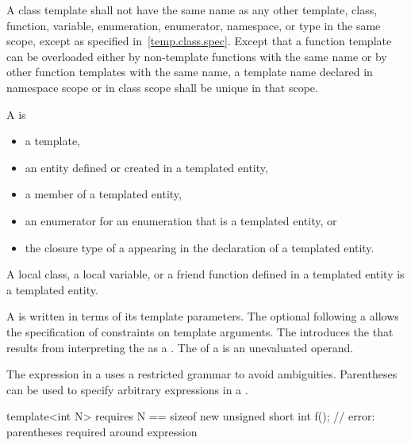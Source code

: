 \pnum
A class template shall not have the same name as any other
template, class, function, variable, enumeration, enumerator, namespace, or
type in the same scope, except as specified in~\ref{temp.class.spec}.
Except that a function template can be overloaded either by non-template
functions with the same name or by other function templates
with the same name,
a template name declared in namespace scope or in class scope shall be unique
in that scope.

\pnum
{}%
A  is

\begin{itemize}
\item a template,
\item an entity defined or created
      in a templated entity,
\item a member of a templated entity,
\item an enumerator for an enumeration that is a templated entity, or
\item the closure type of a 
      appearing in the declaration of a templated entity.
\end{itemize}

\begin{note}
A local class, a local variable, or a friend function defined in a
templated entity is a templated entity.
\end{note}

\pnum
A  is written
in terms of its template parameters.
The optional  following a
 allows the specification of
constraints on template arguments.
The  introduces the
 that results from interpreting
the  as a
.
The  of a
 is an unevaluated operand.
\begin{note}
The expression in a 
uses a restricted grammar to avoid ambiguities.
Parentheses can be used to specify arbitrary expressions
in a .
\begin{example}
\begin{codeblock}
template<int N> requires N == sizeof new unsigned short
int f();            // error: parentheses required around \tcode{==} expression
\end{codeblock}
\end{example}
\end{note}

